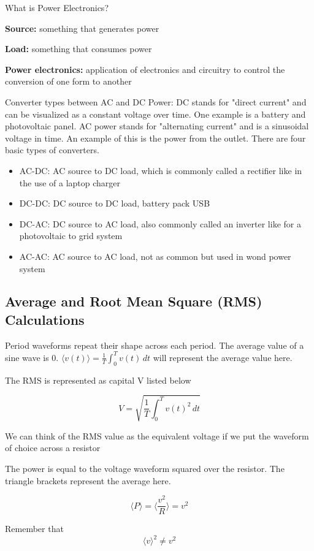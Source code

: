 What is Power Electronics?

\begin{define}
\textbf{Source:} something that generates power

\textbf{Load:} something that consumes power

\textbf{Power electronics:} application of electronics and circuitry to control the conversion of one form to another
\end{define}

Converter types between AC and DC Power: DC stands for "direct current" and can be visualized as a constant voltage over time. One example is a battery and photovoltaic panel. AC power stands for "alternating current" and is a sinusoidal voltage in time. An example of this is the power from the outlet. There are four basic types of converters.
\begin{itemize}
    \item AC-DC: AC source to DC load, which is commonly called a rectifier like in the use of a laptop charger
    \item DC-DC: DC source to DC load, battery pack USB
    \item DC-AC: DC source to AC load, also commonly called an inverter like for a photovoltaic to grid system
    \item AC-AC: AC source to AC load, not as common but used in wond power system
\end{itemize}

\subsection{Average and Root Mean Square (RMS) Calculations}
Period waveforms repeat their shape across each period. The average value of a sine wave is 0. $\langle v(t) \rangle = \frac{1}{T} \int_0^T v(t) \,dt$ will represent the average value here.

The RMS is represented as capital V listed below
\begin{define}
    \[V = \sqrt{\frac{1}{T} \int_0^T v(t)^2 \,dt}\]
\end{define}
We can think of the RMS value as the equivalent voltage if we put the waveform of choice across a resistor

The power is equal to the voltage waveform squared over the resistor. The triangle brackets represent the average here.
\begin{define}
    \[\langle P \rangle = \langle \frac{v^2}{R} \rangle = v^2\]
\end{define}
Remember that 
\[\langle v \rangle ^2 \neq v^2\]

